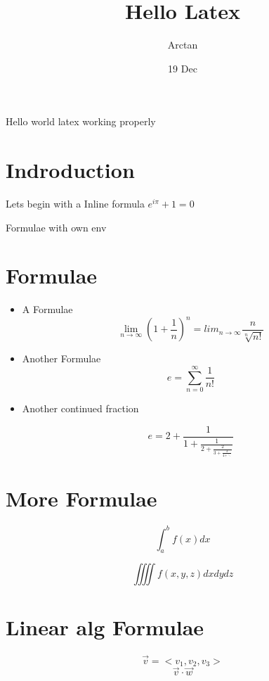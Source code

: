 \documentclass{article}
\title{Hello Latex}
\author{Arctan}
\date{19 Dec}
\begin{document}
    \maketitle
    Hello world  latex working properly
    \section{Indroduction}

    Lets begin with a Inline formula $e^{i\pi} + 1 =0$

Formulae with own env
    \section*{Formulae}
    \begin{itemize}  %
   \item A Formulae
     $$ \lim_{n\to\infty} \left(1+\frac{1}{n}\right)^n = lim_{n\to\infty}\frac{n}{\sqrt[n]{n!}} $$

   \item Another Formulae
     $$e = \sum_{n=0}^{\infty}\frac{1}{n!}$$
    
  \item  Another continued fraction

     $$e = 2+\frac{1}{1+\frac{1}{2+\frac{2}{3+\frac{3}{4+\ddots}}}}$$

\end{itemize}
    \section{More Formulae}

     $$ \int_a^bf(x)dx $$

    $$\iiiint f(x,y,z)dxdydz$$

    \section{Linear alg Formulae}
    $$\vec{v}=<v_1, v_2,v_3>$$
    $$\vec{v}\cdot\vec{w}$$

    \
\end{document}
